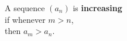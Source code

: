 \documentclass[border=6pt]{standalone}
\begin{document}
\parbox{2in}{A sequence $(a_n)$ is \textbf{increasing} \\
  \null\quad if whenever $m > n$, \\
  \null\quad\quad then $a_m > a_n$.}
\end{document}

